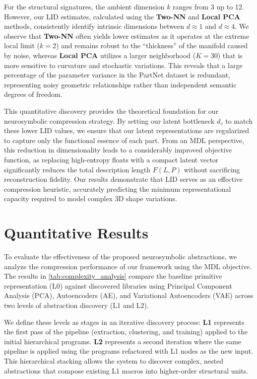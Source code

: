 \documentclass{thesis}
\begin{document}
For the structural signatures, the ambient dimension $k$ ranges from 3 up to 12. However, our LID estimates, calculated using the \textbf{Two-NN} and \textbf{Local PCA} methods, consistently identify intrinsic dimensions between $d \approx 1$ and $d \approx 4$. We observe that \textbf{Two-NN} often yields lower estimates as it operates at the extreme local limit ($k=2$) and remains robust to the ``thickness'' of the manifold caused by noise, whereas \textbf{Local PCA} utilizes a larger neighborhood ($K=30$) that is more sensitive to curvature and stochastic variations. This reveals that a large percentage of the parameter variance in the PartNet dataset is redundant, representing noisy geometric relationships rather than independent semantic degrees of freedom.

This quantitative discovery provides the theoretical foundation for our neurosymbolic compression strategy. By setting our latent bottleneck $d_z$ to match these lower LID values, we ensure that our latent representations are regularized to capture only the functional essence of each part. From an MDL perspective, this reduction in dimensionality leads to a considerably improved objective function, as replacing high-entropy floats with a compact latent vector significantly reduces the total description length $F(L, P)$ without sacrificing reconstruction fidelity. Our results demonstrate that LID serves as an effective compression heuristic, accurately predicting the minimum representational capacity required to model complex 3D shape variations.

\section{Quantitative Results}

To evaluate the effectiveness of the proposed neurosymbolic abstractions, we analyze the compression performance of our framework using the MDL objective. The results in \autoref{tab:complexity_analysis} compare the baseline primitive representation (L0) against discovered libraries using Principal Component Analysis (PCA), Autoencoders (AE), and Variational Autoencoders (VAE) across two levels of abstraction discovery (L1 and L2).

We define these levels as stages in an iterative discovery process: \textbf{L1} represents the first pass of the pipeline (extraction, clustering, and training) applied to the initial hierarchical programs. \textbf{L2} represents a second iteration where the same pipeline is applied using the programs refactored with L1 nodes as the new input. This hierarchical stacking allows the system to discover complex, nested abstractions that compose existing L1 macros into higher-order structural units.
\end{document}
